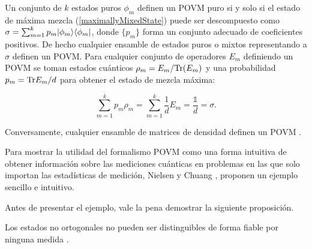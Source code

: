 Un conjunto de $k$ estados puros $\phi_m$ definen un POVM puro si y solo si el estado de máxima  mezcla (\ref{maximallyMixedState}) puede ser descompuesto como  $\sigma=\sum_{m=1}^{k}p_m|\phi_m\rangle \langle\phi_m|$, donde $\{p_m\}$ forma un conjunto adecuado de coeficientes positivos. De hecho cualquier ensamble de estados puros o mixtos representando a $\sigma$ definen un POVM\@. Para cualquier conjunto de operadores $E_m$ definiendo un POVM se toman estados cuánticos $\rho_m=E_m/{\rm Tr}(E_m)$ y una probabilidad $p_m={\rm Tr} E_m/d$ para obtener el estado de mezcla máxima:

\begin{equation}
	\sum_{m=1}^{k} p_m\rho _{m}=\sum_{m=1}^k \dfrac{1}{d}E_m=\dfrac{\mathds{1}}{d}=\sigma.
\end{equation}

Conversamente, cualquier ensamble de matrices de densidad definen un POVM {\cite{2007geometry}}.


Para mostrar la utilidad del formalismo POVM como una forma intuitiva de obtener información sobre las mediciones cuánticas en problemas en las que solo importan las estadísticas de medición, Nielsen y Chuang {\cite{nielsen_chuang_2010}}, proponen un ejemplo sencillo e intuitivo.

Antes de presentar el ejemplo, vale la pena demostrar la siguiente proposición.

\begin{proposition}Los estados no ortogonales no pueden ser distinguibles de forma fiable por ninguna medida {\cite{nielsen_chuang_2010}}.
\end{proposition}


